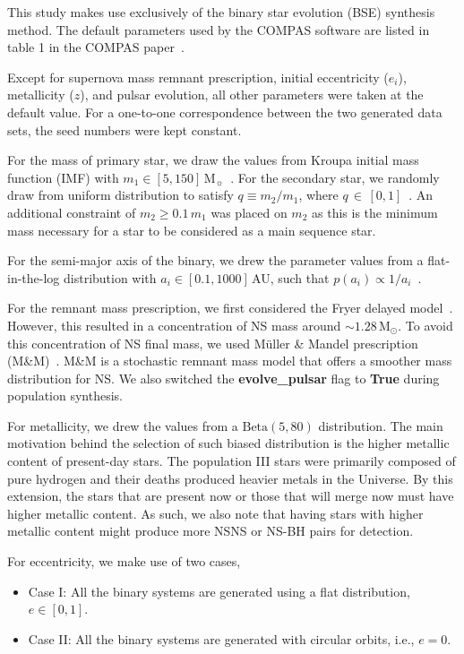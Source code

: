\documentclass[journal, twocolumn]{IEEEtran}
\begin{document}
    This study makes use exclusively of the binary star evolution (BSE) synthesis method.
    The default parameters used by the COMPAS software are listed in table 1 in the COMPAS paper~\cite{Riley2022}.

    Except for supernova mass remnant prescription, initial eccentricity ($e_i$), metallicity ($z$), and pulsar evolution, all other parameters were taken at the default value.
    For a one-to-one correspondence between the two generated data sets, the seed numbers were kept constant.

    For the mass of primary star, we draw the values from Kroupa initial mass function (IMF) with $m_1 \in [5, 150]\,\text{M}_\sun$~\cite{kroupa2001variation}.
    For the secondary star, we randomly draw from uniform distribution to satisfy $q\equiv m_2/m_1$, where $q\,\in\,[0, 1]$~\cite{sana2012binary}.
    An additional constraint of $m_2 \geq 0.1\,m_1$ was placed on $m_2$ as this is the minimum mass necessary for a star to be considered as a main sequence star.

    For the semi-major axis of the binary, we drew the parameter values from a flat-in-the-log distribution with $a_i \in [0.1, 1000]\,$AU, such that $p(a_i) \propto 1/a_i$~\cite{opik1924photographic}.

    For the remnant mass prescription, we first considered the Fryer delayed model~\cite{Fryer2012}.
    However, this resulted in a concentration of NS mass around $\sim1.28\,\text{M}_\odot$.
    To avoid this concentration of NS final mass, we used Müller \& Mandel prescription (M\&M)~\cite{Mandel2020}.
    M\&M is a stochastic remnant mass model that offers a smoother mass distribution for NS\@.
    We also switched the \textbf{evolve\_pulsar} flag to \textbf{True} during population synthesis.

    For metallicity, we drew the values from a $\text{Beta}(5, 80)$ distribution.
    The main motivation behind the selection of such biased distribution is the higher metallic content of present-day stars.
    The population III stars were primarily composed of pure hydrogen and their deaths produced heavier metals in the Universe.
    By this extension, the stars that are present now or those that will merge now must have higher metallic content.
    As such, we also note that having stars with higher metallic content might produce more NSNS or NS-BH pairs for detection.

    For eccentricity, we make use of two cases,
    \begin{itemize}
        \item Case I: All the binary systems are generated using a flat distribution, $e \in [0, 1]$.
        \item Case II: All the binary systems are generated with circular orbits, i.e., $e = 0$.
    \end{itemize}
\end{document}
